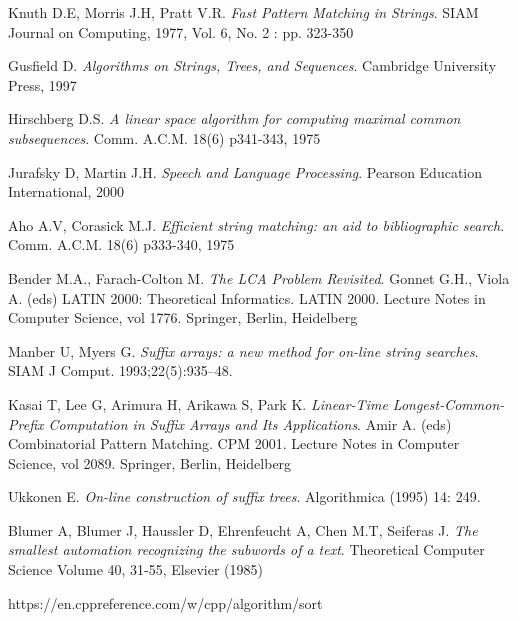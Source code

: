 
\begin{thebibliography}{}

 Knuth D.E, Morris J.H, Pratt V.R. \textit{Fast Pattern Matching in Strings}. SIAM Journal on Computing, 1977, Vol. 6, No. 2 : pp. 323-350

 Gusfield D. \textit{Algorithms on Strings, Trees, and Sequences}. Cambridge University Press, 1997

 Hirschberg D.S. \textit{A linear space algorithm for computing maximal common subsequences}. Comm. A.C.M. 18(6) p341-343, 1975

 Jurafsky D, Martin J.H. \textit{Speech and Language Processing}. Pearson Education International, 2000

 Aho A.V, Corasick M.J. \textit{Efficient string matching: an aid to bibliographic search}. Comm. A.C.M. 18(6) p333-340, 1975

 Bender M.A., Farach-Colton M. \textit{The LCA Problem Revisited}. Gonnet G.H., Viola A. (eds) LATIN 2000: Theoretical Informatics. LATIN 2000. Lecture Notes in Computer Science, vol 1776. Springer, Berlin, Heidelberg

 Manber U, Myers G. \textit{Suffix arrays: a new method for on-line string searches}. SIAM J Comput. 1993;22(5):935--48.

 Kasai T, Lee G, Arimura H, Arikawa S, Park K. \textit{Linear-Time Longest-Common-Prefix Computation in Suffix Arrays and Its Applications}. Amir A. (eds) Combinatorial Pattern Matching. CPM 2001. Lecture Notes in Computer Science, vol 2089. Springer, Berlin, Heidelberg

 Ukkonen E. \textit{On-line construction of suffix trees}. Algorithmica (1995) 14: 249. 

 Blumer A, Blumer J, Haussler D, Ehrenfeucht A, Chen M.T, Seiferas J. \textit{The smallest automation recognizing the subwords of a text}. Theoretical Computer Science
Volume 40, 31-55, Elsevier (1985)


 https://en.cppreference.com/w/cpp/algorithm/sort

\end{thebibliography}

